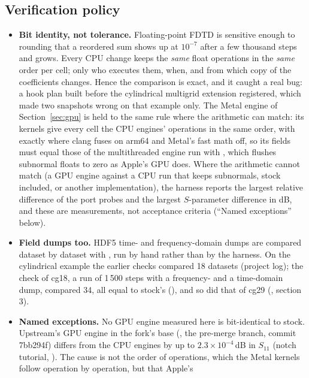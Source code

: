 \subsection{Verification policy}\label{sec:policy}
\begin{itemize}
\item \textbf{Bit identity, not tolerance.} Floating-point FDTD is sensitive enough to rounding that a reordered sum
  shows up at $10^{-7}$ after a few thousand steps and grows. Every CPU change keeps the \emph{same} float operations
  in the \emph{same} order per cell; only who executes them, when, and from which copy of the coefficients changes.
  Hence the comparison is exact, and it caught a real bug: a hook plan built before the cylindrical multigrid
  extension registered, which made two snapshots wrong on that example only. The Metal engine of
  Section~\ref{sec:gpu} is held to the same rule where the arithmetic can match: its kernels give every cell the CPU
  engines' operations in the same order, with  exactly where clang fuses on arm64 and Metal's fast math
  off, so its fields must equal those of the multithreaded engine run with , which flushes
  subnormal floats to zero as Apple's GPU does. Where the arithmetic cannot match (a GPU engine against a CPU run that
  keeps subnormals, stock included, or another implementation), the harness reports the largest relative difference
  of the port probes and the largest $S$-parameter difference in dB, and these are measurements, not acceptance
  criteria (``Named exceptions'' below).
\item \textbf{Field dumps too.} HDF5 time- and frequency-domain dumps are compared dataset by dataset with
  , run by hand rather than by the harness. On the cylindrical example the earlier
  checks compared 18 datasets (project log); the check of cg18, a run of 1\,500 steps with a frequency- and a
  time-domain dump, compared 34, all equal to stock's (), and so did
  that of cg29 (, section 3).
\item \textbf{Named exceptions.} No GPU engine measured here is bit-identical to stock. Upstream's GPU engine in the
  fork's base (, the pre-merge  branch, commit 7bb294f) differs from the CPU
  engines by up to $2.3\times10^{-4}$\,dB in $S_{11}$ (notch tutorial, ).
  The cause is not the order of operations, which the Metal kernels follow operation by operation, but that Apple's

\end{itemize}
